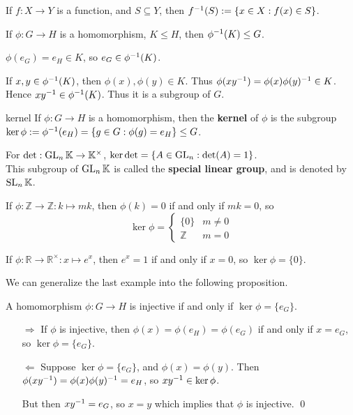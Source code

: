 If $f:X\to Y$ is a function, and $S\subseteq Y$, then $f^{-1} (S):= \{x\in X:f(x)\in S\}$.

\begin{prop}
If $\phi:G\to H$ is a homomorphism, $K\le H$, then $\phi^{-1}(K)\le G$.
\end{prop}

\begin{pf}
$\phi(e_G) = e_H\in K$, so $e_G\in \phi^{-1}(K)$.

If $x,y\in \phi^{-1}(K)$, then $\phi(x),\phi(y)\in K$. Thus $\phi(xy^{-1})=\phi(x)\phi(y)^{-1} \in K$. Hence $xy^{-1}\in \phi^{-1} (K)$. Thus it is a subgroup of $G$.
\end{pf}

\begin{defn}{kernel}
If $\phi: G\to H$ is a homomorphism, then the \textbf{kernel} of $\phi$ is the subgroup $\ker\phi:=\phi^{-1}({e_H})=\{g\in G:\phi(g)=e_H\}\le G$.
\end{defn}

\begin{ex}
For $\det: \operatorname{GL}_n \mathbb K \to \mathbb K^\times$, $\ker \det = \{A\in \operatorname{GL}_n: \det(A)=1\}$.\\
This subgroup of $\operatorname{GL}_n \mathbb K$ is called the \textbf{special linear group}, and is denoted by $\operatorname{SL}_n \mathbb K$.

If $\phi:\mathbb Z\to \mathbb Z: k\mapsto mk$, then $\phi(k)=0$ if and only if $mk=0$, so
$$
\ker \phi=
\begin{cases}
\{0\} & m\ne 0\\
\mathbb Z & m=0
\end{cases}
$$

If $\phi: \mathbb R\to \mathbb R^\times: x\mapsto e^x$, then $e^x=1$ if and only if $x=0$, so $\ker\phi = \{0\}$.
\end{ex}
We can generalize the last example into the following proposition.

\begin{prop}
A homomorphism $\phi:G\to H$ is injective if and only if $\ker\phi = \{e_G\}$.
\end{prop}

\begin{pfno}
\begin{itemize}
	\item[$\Rightarrow$] If $\phi$ is injective, then $\phi(x)=\phi(e_H) = \phi(e_G)$ if and only if $x=e_G$, so $\ker\phi=\{e_G\}$.
	
	\item[$\Leftarrow$] Suppose $\ker\phi=\{e_G\}$, and $\phi(x)=\phi(y)$. Then $\phi(xy^{-1}) = \phi(x)\phi(y)^{-1} = e_H$, so $xy^{-1}\in \ker\phi$.
	
	But then $xy^{-1} = e_G$, so $x=y$ which implies that $\phi$ is injective. \qed
	
\end{itemize}
\end{pfno}

